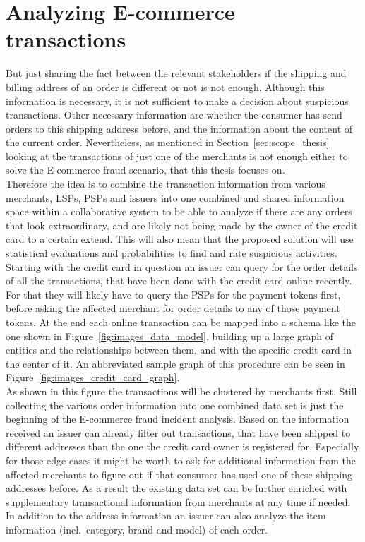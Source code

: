 
\section{Analyzing \gls{E-commerce} transactions}
\label{sec:analyze_transactions}

But just sharing the fact between the relevant stakeholders if the shipping and billing address of an order is different or not is not enough. Although this information is necessary, it is not sufficient to make a decision about suspicious transactions. Other necessary information are whether the consumer has send orders to this shipping address before, and the information about the content of the current order. Nevertheless, as mentioned in Section~\ref{sec:scope_thesis} looking at the transactions of just one of the merchants is not enough either to solve the \gls{E-commerce} fraud scenario, that this thesis focuses on. \\

Therefore the idea is to combine the transaction information from various merchants, \gls{LSP}s, \gls{PSP}s and issuers into one combined and shared information space within a collaborative system to be able to analyze if there are any orders that look extraordinary, and are likely not being made by the owner of the credit card to a certain extend. This will also mean that the proposed solution will use statistical evaluations and probabilities to find and rate suspicious activities. Starting with the credit card in question an issuer can query for the order details of all the transactions, that have been done with the credit card online recently. For that they will likely have to query the \gls{PSP}s for the payment tokens first, before asking the affected merchant for order details to any of those payment tokens. At the end each online transaction can be mapped into a schema like the one shown in Figure~\ref{fig:images_data_model}, building up a large graph of entities and  the relationships between them, and with the specific credit card in the center of it. An abbreviated sample graph of this procedure can be seen in Figure~\ref{fig:images_credit_card_graph}. \\

As shown in this figure the transactions will be clustered by merchants first. Still collecting the various order information into one combined data set is just the beginning of the \gls{E-commerce} fraud incident analysis. Based on the information received an issuer can already filter out transactions, that have been shipped to different addresses than the one the credit card owner is registered for. Especially for those edge cases it might be worth to ask for additional information from the affected merchants to figure out if that consumer has used one of these shipping addresses before. As a result the existing data set can be further enriched with supplementary transactional information from merchants at any time if needed. In addition to the address information an issuer can also analyze the item information (incl.\ category, brand and model) of each order. \\

